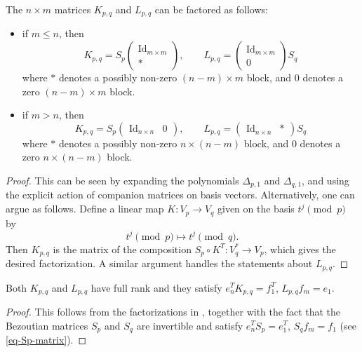 \documentclass[11pt]{article}
\theoremstyle{definition}
\theoremstyle{plain}
\theoremstyle{remark}
\DeclareMathOperator{\id}{Id}
\begin{document}
        \begin{lemma}\label{lemma-factorization}
            The $n \times m$ matrices $K_{p,q}$ and $L_{p,q}$ can be factored as follows:
            \begin{itemize}
                \item if $m \leq n$, then 
                \[
                    K_{p,q} = S_p \begin{pmatrix*}
                        \id_{m \times m} \\ *
                    \end{pmatrix*}, \qquad 
                    L_{p,q} = \begin{pmatrix*}
                        \id_{m \times m} \\ 0
                    \end{pmatrix*} S_q
                \]
                where $*$ denotes a possibly non-zero $(n-m) \times m$ block, and $0$ denotes a zero $(n-m) \times m$ block.

                \item if $m > n$, then 
                \[
                    K_{p,q} = S_p \begin{pmatrix*}
                        \id_{n \times n} & 0
                    \end{pmatrix*}, \qquad 
                    L_{p,q} = \begin{pmatrix*}
                        \id_{n \times n} & *
                    \end{pmatrix*} S_q
                \]
                where $*$ denotes a possibly non-zero $n \times (n-m)$ block, and $0$ denotes a zero $n \times (n-m)$ block.
            \end{itemize}
        \end{lemma}
        \begin{proof}
            This can be seen by expanding the polynomials $\Delta_{p,1}$ and $\Delta_{q,1}$, and using the explicit action of companion matrices on basis vectors. Alternatively, one can argue as follows. Define a linear map $K\colon V_p \to V_q$ given on the basis $t^j \pmod{p}$ by 
            \[
                t^j \pmod{p} \mapsto t^j \pmod{q}.
            \]
            Then $K_{p,q}$ is the matrix of the composition $S_p \circ K^T\colon V_q^* \to V_p$, which gives the desired factorization. A similar argument handles the statements about $L_{p,q}$.
        \end{proof}
        \begin{corollary}\label{corollary-bez}
            Both $K_{p,q}$ and $L_{p,q}$ have full rank and they satisfy $e_n^TK_{p,q} = f_1^T$, $L_{p,q}f_m=e_1$. 
        \end{corollary}
        \begin{proof}
            This follows from the factorizations in , together with the fact that the Bezoutian matrices $S_p$ and $S_q$ are invertible and satisfy $e_n^TS_p = e_1^T$, $S_qf_m=f_1$ (see \eqref{eq-Sp-matrix}).
        \end{proof}
         
\end{document}
